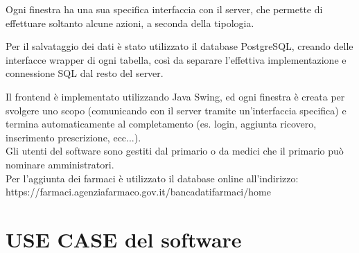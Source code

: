 \documentclass{article}
\begin{document}
Ogni finestra ha una sua specifica interfaccia con il server, che permette di effettuare soltanto alcune azioni, a seconda della tipologia.

Per il salvataggio dei dati \`e stato utilizzato il database PostgreSQL, creando delle interfacce wrapper di ogni tabella, cos\`i da separare
l'effettiva implementazione e connessione SQL dal resto del server.

Il frontend \`e implementato utilizzando Java Swing, ed ogni finestra \`e creata per svolgere uno scopo (comunicando con il server
tramite un'interfaccia specifica) e termina automaticamente al completamento (es. login, aggiunta ricovero, inserimento prescrizione, ecc...).\\

Gli utenti del software sono gestiti dal primario o da medici che il primario pu\`o nominare amministratori.\\

Per l'aggiunta dei farmaci \`e utilizzato il database online all'indirizzo:\\
https://farmaci.agenziafarmaco.gov.it/bancadatifarmaci/home


\section{USE CASE del software}

	\vspace{0.5cm}
\end{document}
